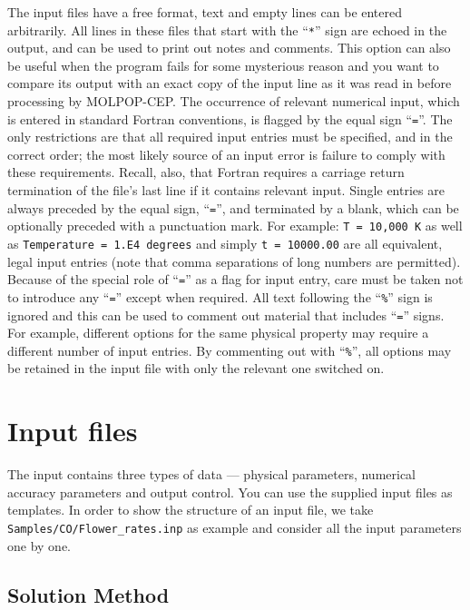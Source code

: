 \documentclass[12pt]{article}
\def\M{MOLPOP-CEP}
\begin{document}
The input files have a free format, text and empty lines can be entered
arbitrarily. All lines in these files that start with the ``\texttt{*}'' sign are echoed in
the output, and can be used to print out notes and comments. This option can
also be useful when the program fails for some mysterious reason and you want
to compare its output with an exact copy of the input line as it was read in
before processing by \M. The occurrence of relevant numerical input, which is
entered in standard Fortran conventions, is flagged by the equal sign
``\texttt{=}''. The only restrictions are that all required input entries must
be specified, and in the correct order; the most likely source of an input
error is failure to comply with these requirements.  Recall, also, that Fortran
requires a carriage return termination of the file's last line if it contains
relevant input. Single entries are always preceded by the equal sign,
``\texttt{=}'', and terminated by a blank, which can be optionally preceded
with a punctuation mark.  For example: \texttt{T = 10,000 K} as well as
\texttt{Temperature = 1.E4 degrees} and simply \texttt{t = 10000.00} are all
equivalent, legal input entries (note that comma separations of long numbers
are permitted).  Because of the special role of ``\texttt{=}'' as a flag for
input entry, care must be taken not to introduce any ``\texttt{=}'' except when
required.  All text following the ``\texttt{\%}'' sign is ignored and this can
be used to comment out material that includes ``\texttt{=}'' signs.  For
example, different options for the same physical property may require a
different number of input entries. By commenting out with ``\texttt{\%}'', all
options may be retained in the input file with only the relevant one switched
on.


%

\section{Input files}

The input contains three types of data --- physical parameters, numerical
accuracy parameters and output control.  You can use the supplied input files
as templates. In order to show the structure of an input file, we take
\texttt{Samples/CO/Flower\_rates.inp} as example and consider all the input
parameters one by one.

\subsection{Solution Method}
\end{document}
